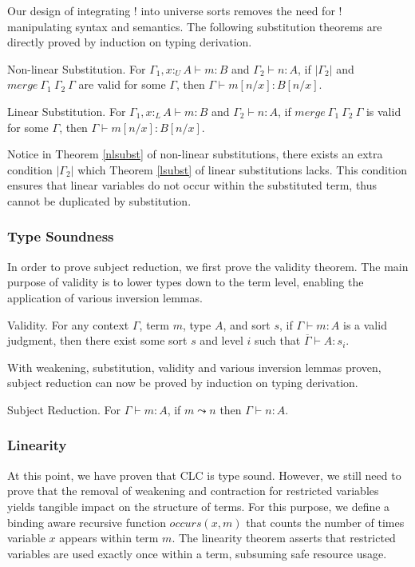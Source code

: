 \documentclass[sigplan,screen,review,anonymous]{acmart}
\newcommand{\pure}[1]{|#1|}
\newcommand{\utype}{:_{\scriptscriptstyle U}}
\newcommand{\ltype}{:_{\scriptscriptstyle L}}
\newcommand{\step}{\leadsto}
\newcommand{\mrg}[3]{merge\ {#1}\ {#2}\ {#3}}
\begin{document}
Our design of integrating ! into universe sorts removes the need for ! manipulating syntax and semantics. The following substitution theorems are directly proved by induction on typing derivation.

\begin{theorem}\label{nlsubst}
  Non-linear Substitution. For $\Gamma_1, x \utype A \vdash m : B$ and $\Gamma_2 \vdash n : A$, if $\pure{\Gamma_2}$ and $\mrg{\Gamma_1}{\Gamma_2}{\Gamma}$ are valid for some $\Gamma$, then $\Gamma \vdash m[n/x] : B[n/x]$.
\end{theorem}

\begin{theorem}\label{lsubst}
  Linear Substitution. For $\Gamma_1, x \ltype A \vdash m : B$ and $\Gamma_2 \vdash n : A$, if $\mrg{\Gamma_1}{\Gamma_2}{\Gamma}$ is valid for some $\Gamma$, then $\Gamma \vdash m[n/x] : B[n/x]$.
\end{theorem}

Notice in Theorem \ref{nlsubst} of non-linear substitutions, there exists an extra condition $\pure{\Gamma_2}$ which Theorem \ref{lsubst} of linear substitutions lacks. This condition ensures that linear variables do not occur within the substituted term, thus cannot be duplicated by substitution.

\subsubsection{Type Soundness}
In order to prove subject reduction, we first prove the validity theorem. The main purpose of validity is to lower types down to the term level, enabling the application of various inversion lemmas.

\begin{theorem}
  Validity. For any context $\Gamma$, term $m$, type $A$, and sort $s$, if $\Gamma \vdash m : A$ is a valid judgment, then there exist some sort $s$ and level $i$ such that $\overline{\Gamma} \vdash A : s_i$.
  \label{validity}
\end{theorem}

With weakening, substitution, validity and various inversion lemmas proven, subject reduction can now be proved by induction on typing derivation.

\begin{theorem}
  Subject Reduction. For $\Gamma \vdash m : A$, if $m \step n$ then $\Gamma \vdash n : A$.
\end{theorem}

\subsubsection{Linearity}
At this point, we have proven that CLC is type sound. However, we still need to prove that the removal of weakening and contraction for restricted variables yields tangible impact on the structure of terms. For this purpose, we define a binding aware recursive function $occurs(x, m)$ that counts the number of times variable $x$ appears within term $m$. The linearity theorem asserts that restricted variables are used exactly once within a term, subsuming safe resource usage.
\end{document}
